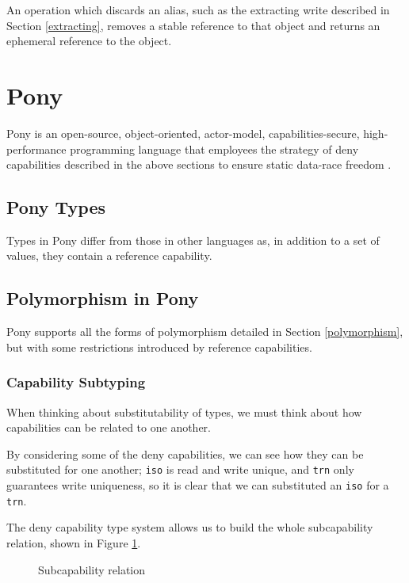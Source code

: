 An operation which discards an alias, such as the extracting write described in Section \ref{extracting}, removes a stable reference to that object and returns an ephemeral reference to the object.

\section{Pony}

Pony is an open-source, object-oriented, actor-model, capabilities-secure, high-performance programming language that employees the strategy of deny capabilities described in the above sections to ensure static data-race freedom \cite{PonyWeb}.

\subsection{Pony Types}

Types in Pony differ from those in other languages as, in addition to a set of values, they contain a reference capability.

\subsection{Polymorphism in Pony}

Pony supports all the forms of polymorphism detailed in Section \ref{polymorphism}, but with some restrictions introduced by reference capabilities.

\subsubsection{Capability Subtyping}

When thinking about substitutability of types, we must think about how capabilities can be related to one another.

By considering some of the deny capabilities, we can see how they can be substituted for one another; \texttt{iso} is read and write unique, and \texttt{trn} only guarantees write uniqueness, so it is clear that we can substituted an \texttt{iso} for a \texttt{trn}. 

The deny capability type system \cite{Clebsch2015} allows us to build the whole subcapability relation, shown in Figure \ref{fig:subcap}.

\begin{figure}[h]
    \centering
    
    \caption{Subcapability relation}
    \label{fig:subcap}
\end{figure}

